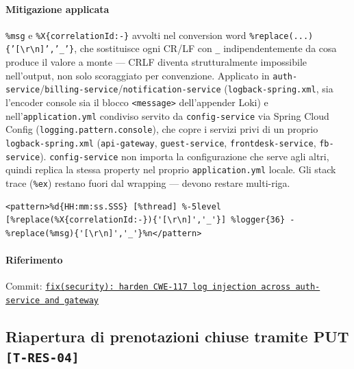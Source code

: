 ﻿\documentclass[a4paper,12pt]{report}
\newcommand{\commitref}[2]{\texttt{\small \href{https://github.com/diegoandruccioli/hotel-pms/commit/#1}{#2}}}
\newcommand{\threat}[1]{\texttt{\small\textcolor{vulnred}{[#1]}}}
\begin{document}
\paragraph{Mitigazione applicata}
\texttt{\%msg} e \texttt{\%X\{correlationId:-\}} avvolti nel conversion word
\texttt{\%replace(...)\{'[\textbackslash r\textbackslash n]','\_'\}}, che
sostituisce ogni CR/LF con \texttt{\_} indipendentemente da cosa produce il
valore a monte --- CRLF diventa strutturalmente impossibile nell'output,
non solo scoraggiato per convenzione. Applicato in
\texttt{auth-service}/\texttt{billing-service}/\texttt{notification-service}
(\texttt{logback-spring.xml}, sia l'encoder console sia il blocco
\texttt{<message>} dell'appender Loki) e nell'\texttt{application.yml}
condiviso servito da \texttt{config-service} via Spring Cloud Config
(\texttt{logging.pattern.console}), che copre i servizi privi di un proprio
\texttt{logback-spring.xml} (\texttt{api-gateway}, \texttt{guest-service},
\texttt{frontdesk-service}, \texttt{fb-service}). \texttt{config-service}
non importa la configurazione che serve agli altri, quindi replica la
stessa property nel proprio \texttt{application.yml} locale. Gli stack
trace (\texttt{\%ex}) restano fuori dal wrapping --- devono restare
multi-riga.

\begin{securebox}[title={logback-spring.xml --- pattern con encoder rafforzato (fix)}]
\begin{lstlisting}[style=xml]
<pattern>%d{HH:mm:ss.SSS} [%thread] %-5level [%replace(%X{correlationId:-}){'[\r\n]','_'}] %logger{36} - %replace(%msg){'[\r\n]','_'}%n</pattern>
\end{lstlisting}
\end{securebox}

\paragraph{Riferimento} Commit: \commitref{3b62006}{fix(security): harden CWE-117 log injection across auth-service and gateway}

\subsection{Riapertura di prenotazioni chiuse tramite PUT \threat{T-RES-04}}
\end{document}
